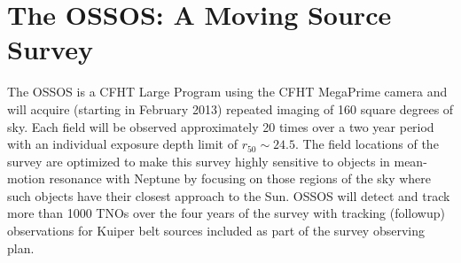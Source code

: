 \section{The OSSOS: A Moving Source Survey}

The OSSOS is a CFHT Large Program using the CFHT MegaPrime camera and will acquire (starting in February 2013) repeated imaging of 160 square degrees of sky.  Each field will be observed approximately 20 times over a two year period with an individual exposure depth limit of $r_{50} \sim 24.5$.  The field locations  of the survey are optimized to make this survey highly sensitive to objects in mean-motion resonance with Neptune by focusing on those regions of the sky where such objects have their closest approach to the Sun. OSSOS will detect and track more than 1000 TNOs over the four years of the survey with tracking (followup) observations for Kuiper belt sources included as part of the survey observing plan.

